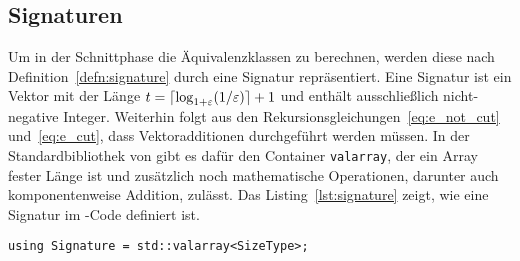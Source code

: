\subsection{Signaturen}
Um in der Schnittphase die Äquivalenzklassen zu berechnen, werden diese nach Definition~\ref{defn:signature} durch eine Signatur repräsentiert.
Eine Signatur ist ein Vektor mit der Länge $t = \lceil\log_{1+\varepsilon}(1/\varepsilon)\rceil + 1$ und enthält ausschließlich nicht-negative Integer.
Weiterhin folgt aus den Rekursionsgleichungen~\eqref{eq:e_not_cut} und~\eqref{eq:e_cut}, dass Vektoradditionen durchgeführt werden müssen.
In der Standardbibliothek von \Cpp{} gibt es dafür den Container \texttt{valarray}, der ein Array fester Länge ist und zusätzlich noch mathematische Operationen, darunter auch komponentenweise Addition, zulässt. 
Das Listing~\ref{lst:signature} zeigt, wie eine Signatur im \Cpp\hyp Code definiert ist.
\begin{lstlisting}[caption={Definition von \texttt{Signature}}, label={lst:signature}]
using Signature = std::valarray<SizeType>;
\end{lstlisting}

